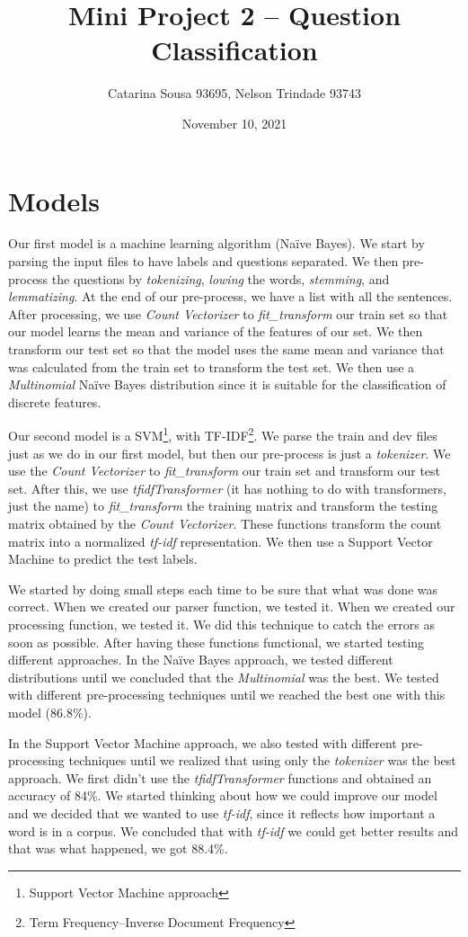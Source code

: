 \documentclass[11pt]{article}
\title{Mini Project 2 – Question Classification}
\author{Catarina Sousa 93695, Nelson Trindade 93743}
\date{November 10, 2021}
\begin{document}
\maketitle

\section{Models}
Our first model is a machine learning algorithm (Naïve Bayes). We start by parsing the input files to have labels and questions separated. We then pre-process the questions by \emph{tokenizing}, \emph{lowing} the words, \emph{stemming}, and \emph{lemmatizing}. At the end of our pre-process, we have a list with all the sentences. After processing, we use \emph{Count Vectorizer} to \emph{fit\_transform} our train set so that our model learns the mean and variance of the features of our set. We then transform our test set so that the model uses the same mean and variance that was calculated from the train set to transform the test set. We then use a \emph{Multinomial} Naïve Bayes distribution since it is suitable for the classification of discrete features.

Our second model is a SVM\footnote[1]{Support Vector Machine approach}, with TF-IDF\footnote[2]{Term Frequency–Inverse Document Frequency}. We parse the train and dev files just as we do in our first model, but then our pre-process is just a \emph{tokenizer}. We use the \emph{Count Vectorizer} to \emph{fit\_transform} our train set and transform our test set. After this, we use \emph{tfidfTransformer} (it has nothing to do with transformers, just the name) to \emph{fit\_transform} the training matrix and transform the testing matrix obtained by the \emph{Count Vectorizer}. These functions transform the count matrix into a normalized \emph{tf-idf} representation. We then use a Support Vector Machine to predict the test labels.

We started by doing small steps each time to be sure that what was done was correct. When we created our parser function, we tested it. When we created our processing function, we tested it. We did this technique to catch the errors as soon as possible. After having these functions functional, we started testing different approaches. 
In the Naïve Bayes approach, we tested different distributions until we concluded that the \emph{Multinomial} was the best. We tested with different pre-processing techniques until we reached the best one with this model (86.8\%).

In the Support Vector Machine approach, we also tested with different pre-processing techniques until we realized that using only the \emph{tokenizer} was the best approach. We first didn’t use the \emph{tfidfTransformer} functions and obtained an accuracy of 84\%. We started thinking about how we could improve our model and we decided that we wanted to use \emph{tf-idf}, since it reflects how important a word is in a corpus. We concluded that with \emph{tf-idf} we could get better results and that was what happened, we got 88.4\%.
\end{document}
